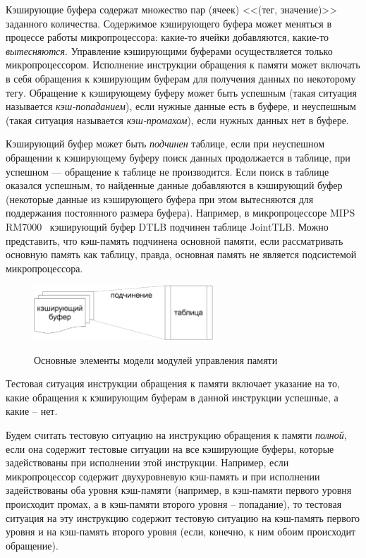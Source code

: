 Кэширующие буфера содержат множество пар (ячеек) <<(тег, значение)>>
заданного количества. Содержимое кэширующего буфера может меняться в
процессе работы микропроцессора: какие-то ячейки добавляются,
какие-то \emph{вытесняются}. Управление кэширующими буферами
осуществляется только микропроцессором. Исполнение инструкции
обращения к памяти может включать в себя обращения к кэширующим
буферам для получения данных по некоторому тегу. Обращение к
кэширующему буферу может быть успешным (такая ситуация называется
\emph{кэш-попаданием}), если нужные данные есть в буфере, и
неуспешным (такая ситуация называется \emph{кэш-промахом}), если
нужных данных нет в буфере.

Кэширующий буфер может быть \emph{подчинен} таблице, если при
неуспешном обращении к кэширующему буферу поиск данных продолжается
в таблице, при успешном --- обращение к таблице не производится.
Если поиск в таблице оказался успешным, то найденные данные
добавляются в кэширующий буфер (некоторые данные из кэширующего
буфера при этом вытесняются для поддержания постоянного размера
буфера). Например, в микропроцессоре MIPS RM7000~\cite{mips64_III}
кэширующий буфер DTLB подчинен таблице JointTLB. Можно представить,
что кэш-память подчинена основной памяти, если рассматривать
основную память как таблицу, правда, основная память не является
подсистемой микропроцессора.

\begin{figure}[h] \center
  \includegraphics[width=0.6\textwidth]{2.theor/elements}\\
  \caption{Основные элементы модели модулей управления памяти}
\end{figure}

Тестовая ситуация инструкции обращения к памяти включает указание на
то, какие обращения к кэширующим буферам в данной инструкции
успешные, а какие -- нет.

Будем считать тестовую ситуацию на инструкцию обращения к памяти
\emph{полной}, если она содержит тестовые ситуации на все кэширующие
буферы, которые задействованы при исполнении этой инструкции.
Например, если микропроцессор содержит двухуровневую кэш-память и
при исполнении задействованы оба уровня кэш-памяти (например, в
кэш-памяти первого уровня происходит промах, а в кэш-памяти второго
уровня -- попадание), то тестовая ситуация на эту инструкцию
содержит тестовую ситуацию на кэш-память первого уровня и на
кэш-память второго уровня (если, конечно, к ним обоим происходит
обращение).

